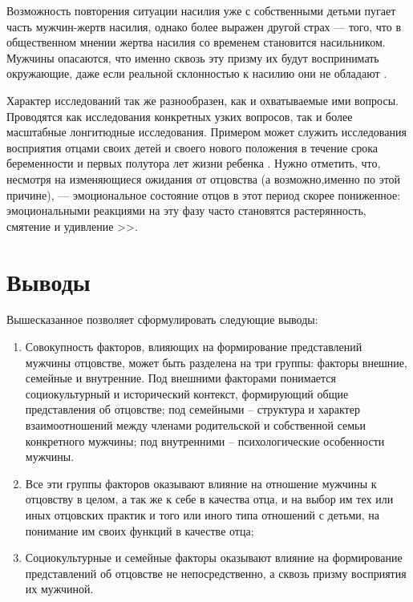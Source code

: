 \documentclass{../../common/thesisbyxetex}
\begin{document}
Возможность повторения ситуации насилия уже с собственными детьми пугает часть мужчин-жертв
насилия, однако более выражен другой страх --- того, что в общественном мнении жертва насилия
со временем становится насильником. Мужчины опасаются, что именно сквозь эту призму их будут
воспринимать окружающие, даже если реальной склонностью к насилию они не обладают \cite{sex}.

Характер исследований так же разнообразен, как и охватываемые ими вопросы. Проводятся как
исследования конкретных узких вопросов, так и более масштабные лонгитюдные исследования. Примером
может служить исследования восприятия отцами своих детей и своего нового положения в течение срока
беременности и первых полутора лет жизни ребенка \cite{percep}. Нужно отметить, что, несмотря на
изменяющиеся ожидания от отцовства (а возможно,именно по этой причине), --- эмоциональное состояние
отцов в этот период скорее пониженное: эмоциональными реакциями на эту фазу часто
становятся растерянность, смятение и удивление \cite[12]{meta}>>.

\section*{Выводы}

Вышесказанное позволяет сформулировать следующие выводы:

\begin{enumerate}
 \item Совокупность факторов, влияющих на формирование представлений мужчины отцовстве, может быть 
разделена на три группы: факторы внешние, семейные и внутренние. Под внешними факторами понимается 
социокультурный и исторический контекст, формирующий общие представления об отцовстве; под 
семейными -- структура и характер взаимоотношений между членами родительской и собственной семьи 
конкретного мужчины; под внутренними -- психологические особенности мужчины.

 \item Все эти группы факторов оказывают влияние на отношение мужчины к отцовству в целом, а так же 
к себе в качества отца, и на выбор им тех или иных отцовских практик и того или иного типа 
отношений с детьми, на понимание им своих функций в качестве отца;

 \item Социокультурные и семейные факторы оказывают влияние на формирование представлений об 
отцовстве не непосредственно, а сквозь призму восприятия их мужчиной. 

\end{enumerate}
\end{document}
